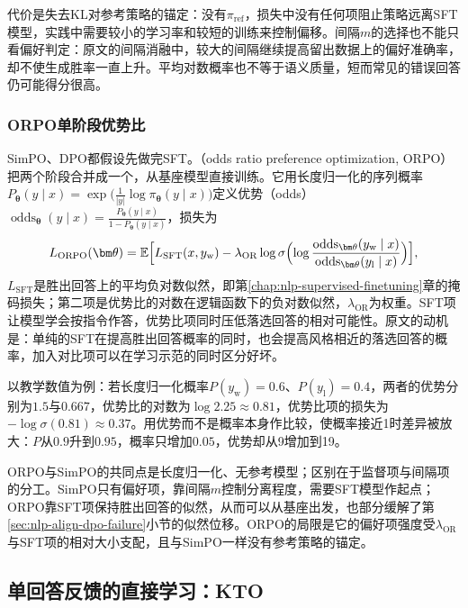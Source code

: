 代价是失去KL对参考策略的锚定：没有$\pi_{\mathrm{ref}}$，损失中没有任何项阻止策略远离SFT模型，实践中需要较小的学习率和较短的训练来控制偏移。间隔$m$的选择也不能只看偏好判定：原文的间隔消融中，较大的间隔继续提高留出数据上的偏好准确率，却不使生成胜率一直上升。平均对数概率也不等于语义质量，短而常见的错误回答仍可能得分很高。

\subsubsection{ORPO单阶段优势比}
\label{sec:nlp-align-orpo}

SimPO、DPO都假设先做完SFT。（odds ratio preference optimization, ORPO）把两个阶段合并成一个，从基座模型直接训练。它用长度归一化的序列概率$P_{\bm\theta}(y\mid x)=\exp\bigl(\frac{1}{|y|}\log\pi_{\bm\theta}(y\mid x)\bigr)$定义优势（odds）$\operatorname{odds}_{\bm\theta}(y\mid x)=\frac{P_{\bm\theta}(y\mid x)}{1-P_{\bm\theta}(y\mid x)}$，损失为
\begin{equation}
\label{eq:nlp-align-orpo}
 L_{\mathrm{ORPO}}(\bm\theta)=\mathbb E\Bigl[L_{\mathrm{SFT}}(x,y_{\mathrm w})
 -\lambda_{\mathrm{OR}}\log\sigma\Bigl(\log\frac{\operatorname{odds}_{\bm\theta}(y_{\mathrm w}\mid x)}{\operatorname{odds}_{\bm\theta}(y_{\mathrm l}\mid x)}\Bigr)\Bigr],
\end{equation}
$L_{\mathrm{SFT}}$是胜出回答上的平均负对数似然，即第\ref{chap:nlp-supervised-finetuning}章的掩码损失；第二项是优势比的对数在逻辑函数下的负对数似然，$\lambda_{\mathrm{OR}}$为权重。SFT项让模型学会按指令作答，优势比项同时压低落选回答的相对可能性。原文的动机是：单纯的SFT在提高胜出回答概率的同时，也会提高风格相近的落选回答的概率，加入对比项可以在学习示范的同时区分好坏。

以教学数值为例：若长度归一化概率$P(y_{\mathrm w})=0.6$、$P(y_{\mathrm l})=0.4$，两者的优势分别为$1.5$与$0.667$，优势比的对数为$\log2.25\approx0.81$，优势比项的损失为$-\log\sigma(0.81)\approx0.37$。用优势而不是概率本身作比较，使概率接近1时差异被放大：$P$从$0.9$升到$0.95$，概率只增加$0.05$，优势却从9增加到19。

ORPO与SimPO的共同点是长度归一化、无参考模型；区别在于监督项与间隔项的分工。SimPO只有偏好项，靠间隔$m$控制分离程度，需要SFT模型作起点；ORPO靠SFT项保持胜出回答的似然，从而可以从基座出发，也部分缓解了第\ref{sec:nlp-align-dpo-failure}小节的似然位移。ORPO的局限是它的偏好项强度受$\lambda_{\mathrm{OR}}$与SFT项的相对大小支配，且与SimPO一样没有参考策略的锚定。

\subsection{单回答反馈的直接学习：KTO}
\label{sec:nlp-align-unpaired}


